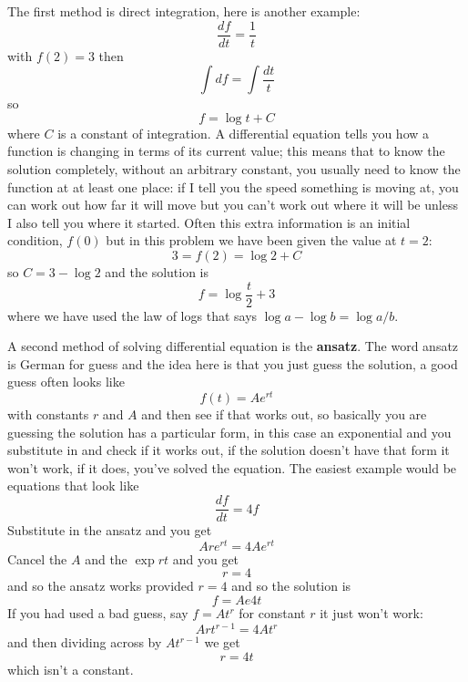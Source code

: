 \documentclass[12pt]{article}
\begin{document}
The first method is direct integration, here is another example:
\begin{equation}
  \frac{df}{dt}=\frac{1}{t}
\end{equation}
with $f(2)=3$ then
\begin{equation}
  \int df = \int \frac{dt}{t}
\end{equation}
so
\begin{equation}
  f=\log{t}+C
\end{equation}
where $C$ is a constant of integration. A differential equation tells
you how a function is changing in terms of its current value; this
means that to know the solution completely, without an arbitrary
constant, you usually need to know the function at at least one place:
if I tell you the speed something is moving at, you can work out how
far it will move but you can't work out where it will be unless I also
tell you where it started. Often this extra information is an initial
condition, $f(0)$ but in this problem we have been given the value at
$t=2$:
\begin{equation}
  3=f(2)=\log{2}+C
\end{equation}
so $C=3-\log{2}$ and the solution is
\begin{equation}
  f=\log{\frac{t}{2}}+3
\end{equation}
where we have used the law of logs that says $\log{a}-\log{b}=\log{a/b}$.

A second method of solving differential equation is the
\textbf{ansatz}. The word ansatz is German for guess and the idea here is that you just guess the solution, a good guess often looks like
\begin{equation}
  f(t)=Ae^{rt}
\end{equation}
with constants $r$ and $A$ and then see if that works out, so basically you are guessing the solution has a particular form, in this case an exponential and you substitute in and check if it works out, if the solution doesn't have that form it won't work, if it does, you've solved the equation. The easiest example would be equations that look like
\begin{equation}
  \frac{df}{dt}=4f
\end{equation}
Substitute in the ansatz and you get
\begin{equation}
  Are^{rt}=4Ae^{rt}
\end{equation}
Cancel the $A$ and the $\exp{rt}$ and you get
\begin{equation}
  r=4
\end{equation}
and so the ansatz works provided $r=4$ and so the solution is
\begin{equation}
  f=Ae{4t}
\end{equation}
If you had used a bad guess, say $f=At^r$ for constant $r$ it just won't work:
\begin{equation}
  Art^{r-1}=4At^r
\end{equation}
and then dividing across by $At^{r-1}$ we get
\begin{equation}
  r=4t
\end{equation}
which isn't a constant.
\end{document}
